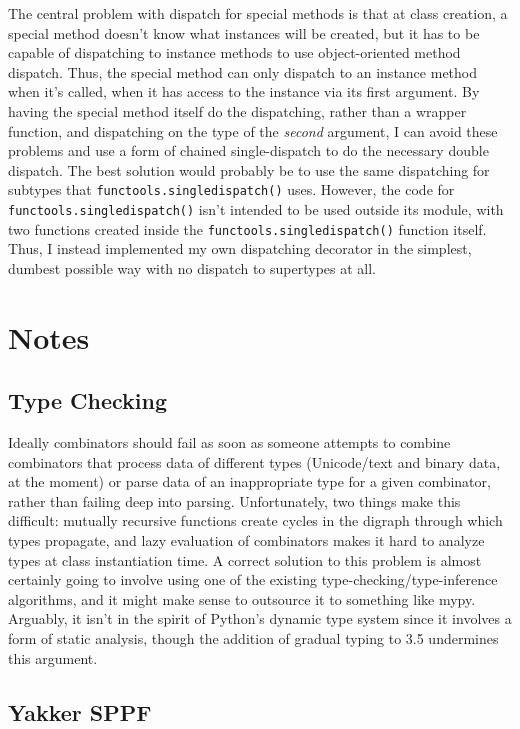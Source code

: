 \documentclass[12pt]{article}
\begin{document}
The central problem with dispatch for special methods is that at class
creation, a special method doesn't know what instances will be
created, but it has to be capable of dispatching to instance methods
to use object-oriented method dispatch.  Thus, the special method can
only dispatch to an instance method when it's called, when it has
access to the instance via its first argument.  By having the special
method itself do the dispatching, rather than a wrapper function, and
dispatching on the type of the \emph{second} argument, I can avoid
these problems and use a form of chained single-dispatch to do the
necessary double dispatch.  The best solution would probably be to use
the same dispatching for subtypes that
\texttt{functools.singledispatch()} uses.  However, the code for
\texttt{functools.singledispatch()} isn't intended to be used outside
its module, with two functions created inside the
\texttt{functools.singledispatch()} function itself.  Thus, I instead
implemented my own dispatching decorator in the simplest, dumbest
possible way with no dispatch to supertypes at all.


\section{Notes}
\label{sec:notes}

\subsection{Type Checking}
\label{sec:type_checking}

Ideally combinators should fail as soon as someone attempts to combine
combinators that process data of different types (Unicode/text and
binary data, at the moment) or parse data of an inappropriate type for
a given combinator, rather than failing deep into parsing.
Unfortunately, two things make this difficult: mutually recursive
functions create cycles in the digraph through which types propagate,
and lazy evaluation of combinators makes it hard to analyze types at
class instantiation time.  A correct solution to this problem is
almost certainly going to involve using one of the existing
type-checking/type-inference algorithms, and it might make sense to
outsource it to something like mypy.  Arguably, it isn't in the spirit
of Python's dynamic type system since it involves a form of static
analysis, though the addition of gradual typing to 3.5 undermines this
argument.

\subsection{Yakker SPPF}
\label{sec:yakker_sppf}
\end{document}
